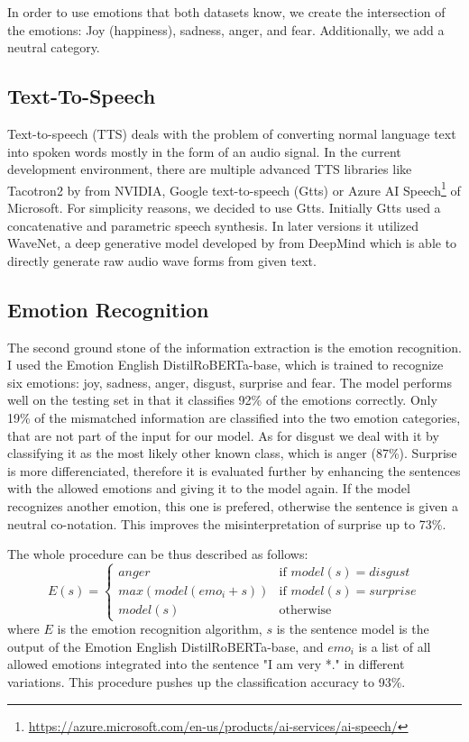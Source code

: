 \documentclass[11pt]{article}
\begin{document}
In order to use emotions that both datasets know, we create the intersection of the emotions: Joy (happiness), sadness, anger, and fear. Additionally, we add a neutral category.
\subsection{Text-To-Speech}
Text-to-speech (TTS) deals with the problem of converting normal language text into spoken words mostly in the form of an audio signal. 
In the current development environment, there are multiple advanced TTS libraries like Tacotron2 by \cite{shen_natural_2018} from NVIDIA, Google text-to-speech (Gtts) \cite{gtts} or Azure AI Speech\footnote{\url{https://azure.microsoft.com/en-us/products/ai-services/ai-speech/}} of Microsoft. For simplicity reasons, we decided to use Gtts. Initially Gtts used a concatenative and parametric speech synthesis. In later versions it utilized WaveNet, a deep generative model developed by \citeauthor{van2016wavenet} from DeepMind which is able to directly generate raw audio wave forms from given text.

\subsection{Emotion Recognition}

The second ground stone of the information extraction is the emotion recognition. I used the Emotion English DistilRoBERTa-base\cite{hartmann2022emotionenglish}, which is trained to recognize six emotions: joy, sadness, anger, disgust, surprise and fear. The model performs well on the testing set in that it classifies 92\% of the emotions correctly. Only 19\% of the mismatched information are classified into the two emotion categories, that are not part of the input for our model. As for disgust we deal with it by classifying it as the most likely other known class, which is anger (87\%). Surprise is more differenciated, therefore it is evaluated further by enhancing the sentences with the allowed emotions and giving it to the model again. If the model recognizes another emotion, this one is prefered, otherwise the sentence is given a neutral co-notation. This improves the misinterpretation of surprise up to 73\%.

The whole procedure can be thus described as follows:
{
\small
\begin{equation*}
E(s)=\begin{cases}
  anger & \text{if } model(s)=disgust\\      
  max(model(emo_i+s)) & \text{if }  model(s)=surprise\\
  model(s) & \text{otherwise } 
\end{cases}
\end{equation*}
}
where $E$ is the emotion recognition algorithm, $s$ is the sentence model is the output of the Emotion English DistilRoBERTa-base, and $emo_i$ is a list of all allowed emotions integrated into the sentence "I am very *." in different variations.
This procedure pushes up the classification accuracy to 93\%.
\end{document}
